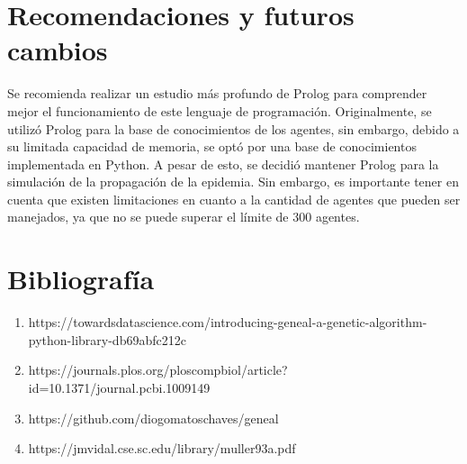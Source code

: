 \section{Recomendaciones y futuros cambios}
Se recomienda realizar un estudio más profundo de Prolog para comprender mejor el funcionamiento de este lenguaje de programación. Originalmente, se utilizó Prolog para la base de conocimientos de los agentes, sin embargo, debido a su limitada capacidad de memoria, se optó por una base de conocimientos implementada en Python. A pesar de esto, se decidió mantener Prolog para la simulación de la propagación de la epidemia. Sin embargo, es importante tener en cuenta que existen limitaciones en cuanto a la cantidad de agentes que pueden ser manejados, ya que no se puede superar el límite de 300 agentes.

\section{Bibliografía}
\begin{enumerate}
\item https://towardsdatascience.com/introducing-geneal-a-genetic-algorithm-python-library-db69abfc212c
\item https://journals.plos.org/ploscompbiol/article?id=10.1371/journal.pcbi.1009149
\item https://github.com/diogomatoschaves/geneal
\item https://jmvidal.cse.sc.edu/library/muller93a.pdf
\end{enumerate}


